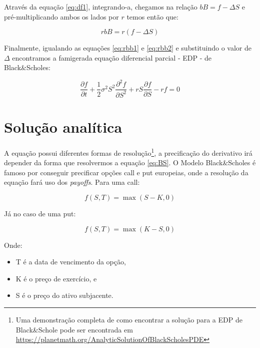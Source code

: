\documentclass[]{book}
\providecommand{\tightlist}{%
  \setlength{\itemsep}{0pt}\setlength{\parskip}{0pt}}
\let\rmarkdownfootnote\footnote%
\def\footnote{\protect\rmarkdownfootnote}
\begin{document}
Através da equação \eqref{eq:df1}, integrando-a, chegamos na relação
\(bB = f - \Delta S\) e pré-multiplicando ambos os lados por \(r\) temos
então que:

\begin{equation}
rbB = r(f-\Delta S) 
\label{eq:rbb2}
\end{equation}

Finalmente, igualando as equações \eqref{eq:rbb1} e \eqref{eq:rbb2} e
substituindo o valor de \(\Delta\) encontramos a famigerada equação
diferencial parcial - EDP - de Black\&Scholes:

\begin{equation}
\frac{\partial f}{\partial t}+\frac{1}{2}\sigma^2S^2\frac{\partial^2 f}{\partial S^2}+rS\frac{\partial f}{\partial S} - rf = 0
\label{eq:BS}
\end{equation}

\section{Solução analítica}\label{solucao-analitica}

A equação possui diferentes formas de resolução\footnote{Uma
  demonstração completa de como encontrar a solução para a EDP de
  Black\&Schole pode ser encontrada em
  \url{https://planetmath.org/AnalyticSolutionOfBlackScholesPDE}}, a
precificação do derivativo irá depender da forma que resolvermos a
equação \eqref{eq:BS}. O Modelo Black\&Scholes é famoso por conseguir
precificar opções call e put europeias, onde a resolução da equação fará
uso dos \emph{payoffs}. Para uma call:

\begin{equation}
\displaystyle f(S,T)=\max(S-K,0)
\label{eq:cpayoff}
\end{equation}

Já no caso de uma put:

\begin{equation}
\displaystyle f(S,T)=\max(K-S,0)
\label{eq:ppayoff}
\end{equation}

Onde:

\begin{itemize}
\tightlist
\item
  T é a data de vencimento da opção,
\item
  K é o preço de exercício, e
\item
  S é o preço do ativo subjacente.
\end{itemize}
\end{document}

